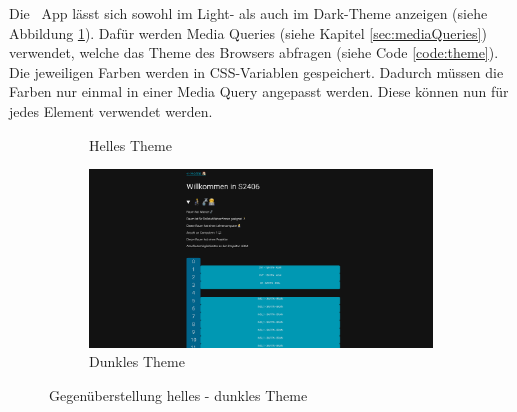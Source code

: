 
Die \ZELIA\ App lässt sich sowohl im Light- als auch im Dark-Theme anzeigen (siehe Abbildung \ref{fig:theme}). 
Dafür werden Media Queries (siehe Kapitel \ref{sec:mediaQueries}) verwendet, welche das Theme des Browsers abfragen (siehe Code \ref{code:theme}). 
Die jeweiligen Farben werden in CSS-Variablen gespeichert. 
Dadurch müssen die Farben nur einmal in einer Media Query angepasst werden. Diese können nun für jedes Element verwendet werden. 

\begin{figure}[H]
    \setlength{\fboxsep}{0pt}
    \begin{subfigure}[c]{0.49\textwidth}
        \centering
        \caption{Helles Theme}
    \end{subfigure} \hfill
    \begin{subfigure}[c]{0.49\textwidth}
        \centering
        \includegraphics[width=\textwidth]{media/ResponsiveDesign/ZeliaDesktopDark.png}
        \caption{Dunkles Theme}
    \end{subfigure}
    \caption{Gegenüberstellung helles - dunkles Theme}
    \label{fig:theme}
\end{figure}

